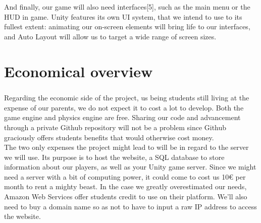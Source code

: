 And finally, our game will also need interfaces[5], such as the main menu or the HUD in game. Unity features its own UI system, that we intend to use to its fullest extent: animating our on-screen elements will bring life to our interfaces, and Auto Layout will allow us to target a wide range of screen sizes.\\

\chapter{Economical overview}

\paragraph{}Regarding the economic side of the project, us being students still living at the expense of our parents, we do not expect it to cost a lot to develop. Both the game engine and physics engine are free. Sharing our code and advancement through a private Github repository will not be a problem since Github graciously offers students benefits that would otherwise cost money.\\

The two only expenses the project might lead to will be in regard to the server we will use. Its purpose is to host the website, a SQL database to store information about our players, as well as your Unity game server. Since we might need a server with a bit of computing power, it could come to cost us 10\euro{} per month to rent a mighty beast. In the case we greatly overestimated our needs, Amazon Web Services offer students credit to use on their platform. We’ll also need to buy a domain name so as not to have to input a raw IP address to access the website.\\

